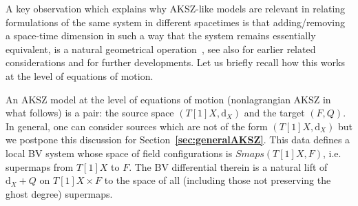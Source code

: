 \documentclass[a4paper,12pt]{article}
\numberwithin{equation}{section} %
\newcommand{\bref}[1]{\textbf{\ref{#1}}}
\newcommand{\dx}{\mathrm{d}_X}
\numberwithin{equation}{section}
\begin{document}
A key observation which explains why AKSZ-like models are relevant in relating formulations of the same system in different spacetimes is that adding/removing a space-time dimension in such a way that the system remains essentially equivalent, is a natural geometrical operation~\cite{Barnich:2006hbb}, see also \cite{Grigoriev:1999qz,Vasiliev:2001zy,Vasiliev:2003ar,Barnich:2003wj} for earlier related considerations and
\cite{Bekaert:2009fg,Bonechi:2009kx,Cattaneo:2012qu,Bekaert:2012vt} for further developments. Let us briefly recall how this works at the level of equations of motion.

An AKSZ model at the level of equations of motion (nonlagrangian  AKSZ in what follows) is a pair: the source space $(T[1]X,\dx)$ and the target $(F,Q)$.  In general, one can consider sources which are not of the form $(T[1]X,\dx)$ but we postpone this discussion for Section~\bref{sec:generalAKSZ}. This data defines a local BV system whose space of field configurations is  $Smaps(T[1]X,F)$, i.e. supermaps from $T[1]X$ to $F$. The BV differential therein is a natural lift of $\dx+Q$ on $T[1]X\times F$ to the space of all (including those not preserving the ghost degree) supermaps.
\end{document}
